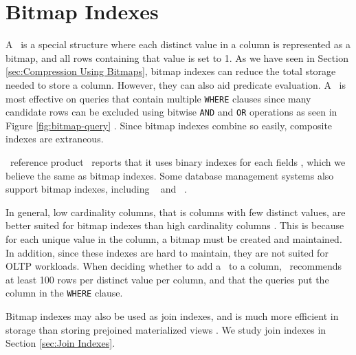 \section{Bitmap Indexes}
\label{sec:Bitmap Indexes}
A \biti~is a special structure where each distinct value in a column is represented as a bitmap, and all rows containing that value is set to 1. As we have seen in Section \ref{sec:Compression Using Bitmaps}, bitmap indexes can reduce the total storage needed to store a column. However, they can also aid predicate evaluation. A \biti~is most effective on queries that contain multiple \texttt{WHERE} clauses since many candidate rows can be excluded using bitwise \texttt{AND} and \texttt{OR} operations as seen in Figure \ref{fig:bitmap-query} \cite{noauthor_undated-hp}. Since bitmap indexes combine so easily, composite indexes are extraneous. 

\genusSoftware~reference product \qlikview~reports that it uses binary indexes for each fields \cite{Qlik2011-ef}, which we believe the same as bitmap indexes. Some database management systems also support bitmap indexes, including \oracle~\cite{noauthor_undated-hp} and \ibm~\cite{Raman2013-em}.

In general, low cardinality columns, that is columns with few distinct values, are better suited for bitmap indexes than high cardinality columns \cite{noauthor_undated-hp}. This is because for each unique value in the column, a bitmap must be created and maintained. In addition, since these indexes are hard to maintain, they are not suited for OLTP workloads. When deciding whether to add a \biti~to a column, \oracle~recommends at least 100 rows per distinct value per column, and that the queries put the column in the \texttt{WHERE} clause.

Bitmap indexes may also be used as join indexes, and is much more efficient in storage than storing prejoined materialized views \cite{noauthor_undated-hp}. We study join indexes in Section \ref{sec:Join Indexes}.


